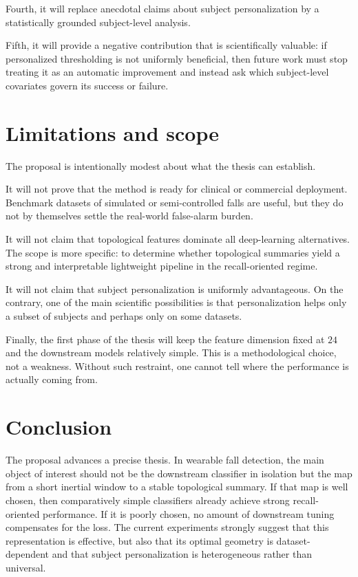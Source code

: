 \documentclass[11pt]{article}
\newcommand{\1}{\mathbf 1}
\begin{document}
Fourth, it will replace anecdotal claims about subject personalization by a statistically grounded subject-level analysis.

Fifth, it will provide a negative contribution that is scientifically valuable: if personalized thresholding is not uniformly beneficial, then future work must stop treating it as an automatic improvement and instead ask which subject-level covariates govern its success or failure.

\section{Limitations and scope}

The proposal is intentionally modest about what the thesis can establish.

It will not prove that the method is ready for clinical or commercial deployment. Benchmark datasets of simulated or semi-controlled falls are useful, but they do not by themselves settle the real-world false-alarm burden.

It will not claim that topological features dominate all deep-learning alternatives. The scope is more specific: to determine whether topological summaries yield a strong and interpretable lightweight pipeline in the recall-oriented regime.

It will not claim that subject personalization is uniformly advantageous. On the contrary, one of the main scientific possibilities is that personalization helps only a subset of subjects and perhaps only on some datasets.

Finally, the first phase of the thesis will keep the feature dimension fixed at $24$ and the downstream models relatively simple. This is a methodological choice, not a weakness. Without such restraint, one cannot tell where the performance is actually coming from.

\section{Conclusion}

The proposal advances a precise thesis. In wearable fall detection, the main object of interest should not be the downstream classifier in isolation but the map from a short inertial window to a stable topological summary. If that map is well chosen, then comparatively simple classifiers already achieve strong recall-oriented performance. If it is poorly chosen, no amount of downstream tuning compensates for the loss. The current experiments strongly suggest that this representation is effective, but also that its optimal geometry is dataset-dependent and that subject personalization is heterogeneous rather than universal.
\end{document}
